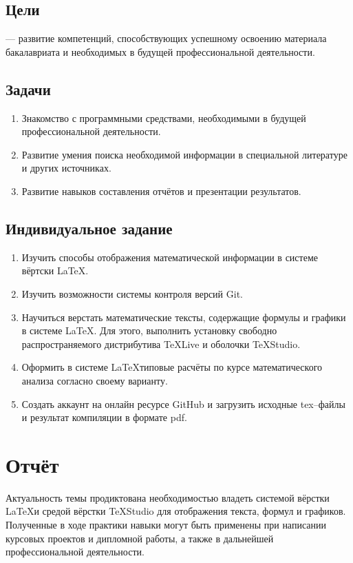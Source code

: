 \documentclass[12pt]{article}
\begin{document}
\subsection{Цели}
--- развитие компетенций, способствующих успешному освоению материала бакалавриата и необходимых в будущей профессиональной деятельности.

\subsection{Задачи}
\begin{enumerate}
\item Знакомство с программными средствами, необходимыми в будущей профессиональной деятельности.
\item Развитие умения поиска необходимой информации в специальной литературе и других источниках.
\item Развитие навыков составления отчётов и презентации результатов.
\end{enumerate}

\subsection{Индивидуальное задание}	
\begin{enumerate}
\item Изучить способы отображения математической информации в системе вёртски \LaTeX.
\item Изучить возможности  системы контроля версий \textsf{Git}.
\item Научиться верстать математические тексты, содержащие формулы и графики в системе \LaTeX.
Для этого, выполнить установку свободно распространяемого дистрибутива \textsf{TeXLive} и оболочки \textsf{TeXStudio}.
\item Оформить в системе \LaTeX типовые расчёты по курсе математического анализа согласно своему варианту.
\item Создать аккаунт на онлайн ресурсе \textsf{GitHub} и загрузить исходные \textsf{tex}--файлы 
и результат компиляции в формате \textsf{pdf}.
\end{enumerate} 

\newpage
\section{Отчёт}
Актуальность темы продиктована необходимостью владеть системой вёрстки \LaTeX и средой вёрстки \textsf{TeXStudio} для
отображения текста, формул и графиков. Полученные в ходе практики навыки могут быть применены при написании
курсовых проектов и дипломной работы, а также в дальнейшей профессиональной деятельности.
\end{document}
